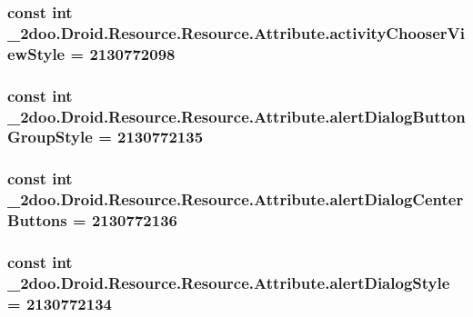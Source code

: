 \hypertarget{class__2doo_1_1_droid_1_1_resource_1_1_attribute_069ce81f8106c4b1300ec1f78b4c1a18}{
\subsubsection[{activityChooserViewStyle}]{\setlength{\rightskip}{0pt plus 5cm}const int \_\-2doo.Droid.Resource.Resource.Attribute.activityChooserViewStyle = 2130772098}}
\label{class__2doo_1_1_droid_1_1_resource_1_1_attribute_069ce81f8106c4b1300ec1f78b4c1a18}


\hypertarget{class__2doo_1_1_droid_1_1_resource_1_1_attribute_15ec19478c89be89faf3753dfa9542f4}{
\subsubsection[{alertDialogButtonGroupStyle}]{\setlength{\rightskip}{0pt plus 5cm}const int \_\-2doo.Droid.Resource.Resource.Attribute.alertDialogButtonGroupStyle = 2130772135}}
\label{class__2doo_1_1_droid_1_1_resource_1_1_attribute_15ec19478c89be89faf3753dfa9542f4}


\hypertarget{class__2doo_1_1_droid_1_1_resource_1_1_attribute_5906e76ceae4beb74331c502a0d932bd}{
\subsubsection[{alertDialogCenterButtons}]{\setlength{\rightskip}{0pt plus 5cm}const int \_\-2doo.Droid.Resource.Resource.Attribute.alertDialogCenterButtons = 2130772136}}
\label{class__2doo_1_1_droid_1_1_resource_1_1_attribute_5906e76ceae4beb74331c502a0d932bd}


\hypertarget{class__2doo_1_1_droid_1_1_resource_1_1_attribute_fe9d3440cffab74f8218d2fbbae546a4}{
\subsubsection[{alertDialogStyle}]{\setlength{\rightskip}{0pt plus 5cm}const int \_\-2doo.Droid.Resource.Resource.Attribute.alertDialogStyle = 2130772134}}
\label{class__2doo_1_1_droid_1_1_resource_1_1_attribute_fe9d3440cffab74f8218d2fbbae546a4}


